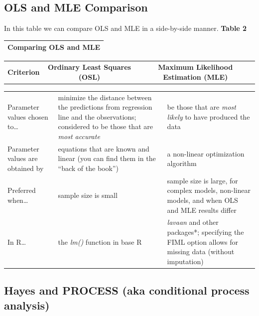 \documentclass[
  english,
]{book}
\begin{document}
\hypertarget{ols-and-mle-comparison}{%
\subsection{OLS and MLE Comparison}\label{ols-and-mle-comparison}}

In this table we can compare OLS and MLE in a side-by-side manner.
\textbf{Table 2}

\begin{longtable}[]{@{}l@{}}
\toprule
Comparing OLS and MLE \citep{cohen_applied_2003, myung_tutorial_2003} \\
\midrule
\endhead
\bottomrule
\end{longtable}

\begin{longtable}[]{@{}ccc@{}}
\toprule
& & \\
\midrule
\endhead
\textbf{Criterion} & \textbf{Ordinary Least Squares (OSL)} & \textbf{Maximum Likelihood Estimation (MLE)} \\
\bottomrule
\end{longtable}

\begin{longtable}[]{@{}
  >{\centering\arraybackslash}p{}
  >{\centering\arraybackslash}p{}
  >{\centering\arraybackslash}p{}@{}}
\toprule
& & \\
\midrule
\endhead
Parameter values chosen to\ldots{} & minimize the distance between the predictions from regression line and the observations; considered to be those that are \emph{most accurate} & be those that are \emph{most likely} to have produced the data \\
Parameter values are obtained by & equations that are known and linear (you can find them in the ``back of the book'') & a non-linear optimization algorithm \\
Preferred when\ldots{} & sample size is small & sample size is large, for complex models, non-linear models, and when OLS and MLE results differ \\
In R\ldots{} & the \emph{lm()} function in base R & \emph{lavaan} and other packages*; specifying the FIML option allows for missing data (without imputation) \\
\bottomrule
\end{longtable}

\hypertarget{hayes-and-process-aka-conditional-process-analysis}{%
\subsection{Hayes and PROCESS (aka conditional process analysis)}\label{hayes-and-process-aka-conditional-process-analysis}}
\end{document}
